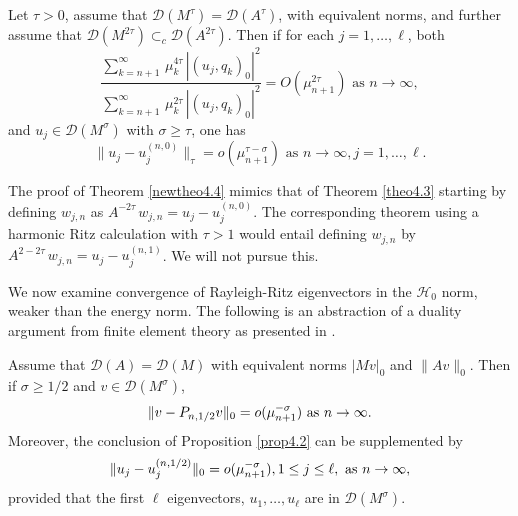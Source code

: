 \documentclass[final]{siamltex}
\numberwithin{equation}{section}
\begin{document}
\begin{theorem} \label{newtheo4.4}
Let $\tau>0$, assume that $\mathcal{D}(M^{\tau}) =\mathcal{D}(A^{\tau})$,
with equivalent norms, and further assume that
$\mathcal{D}(M^{2\tau}) \subset_{c} \mathcal{D}(A^{2\tau})$. Then if for each $j=1, \ldots, \ell$, both
\begin{equation} \label{new4.4}
\frac{\sum_{k=n+1}^{\infty}  \, \mu_{k}^{4 \tau} \, |(u_j, q_k)_0|^2}
{\sum_{k=n+1}^{\infty}  \, \mu_k^{2 \tau} \, |(u_j, q_k)_0|^2}=O\left(\mu_{n+1}^{2 \tau}\right) \text{ as } n\to \infty,
\end{equation}
and $u_j \in \mathcal{D}(M^{\sigma})$ with $\sigma\ge \tau$, one has
\[\|u_j-u_j^{(n,0)}\|_{\tau} = o\left(\mu_{n+1}^{\tau-\sigma} \right) \text{ as } n\to \infty, j=1, \dots, \ell.\]
\end{theorem}

The proof of Theorem \ref{newtheo4.4} mimics that of Theorem \ref{theo4.3} starting by defining $w_{j,n}$ as $A^{-2 \tau} \, w_{j,n}= u_j-u_j^{(n,0)}$.
The corresponding theorem using a harmonic Ritz calculation with $\tau>1$ would entail defining $w_{j,n}$ by $A^{2-2 \tau} \, w_{j,n}= u_j-u_j^{(n,1)}$. We will not pursue this.

We now examine convergence of Rayleigh-Ritz eigenvectors in the $\mathcal{H}_0$ norm, weaker than the energy norm. The following is an abstraction of a duality argument from finite element theory as presented in \cite{Brenner-Scott}.

\begin{theorem} \label{newtheo4.5}
Assume that $\mathcal{D}(A)=\mathcal{D}(M)$ with equivalent norms $|M v|_0$ and $\|A v\|_0$. Then if $\sigma \ge 1/2$ and $v \in \mathcal{D}(M^{\sigma})$,
\begin{equation} \notag
\|v- P_{n,1/2} v\|_0 =o(\mu_{n+1}^{-\sigma}) \text{ as } n\to \infty.
\end{equation}
Moreover, the conclusion of Proposition \ref{prop4.2} can be supplemented by
\begin{equation} \notag
\|u_j- u_j^{(n,1/2)}\|_0 =o(\mu_{n+1}^{-\sigma}), 1\le j \le \ell, \text{ as } n\to \infty,
\end{equation}
provided that the first $\ell$ eigenvectors, $u_1, \ldots, u_{\ell}$ are in $\mathcal{D}(M^{\sigma})$.
\end{theorem}
\end{document}
